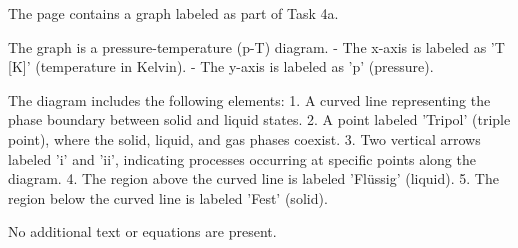 The page contains a graph labeled as part of Task 4a.  

The graph is a pressure-temperature (p-T) diagram.  
- The x-axis is labeled as 'T [K]' (temperature in Kelvin).  
- The y-axis is labeled as 'p' (pressure).  

The diagram includes the following elements:  
1. A curved line representing the phase boundary between solid and liquid states.  
2. A point labeled 'Tripol' (triple point), where the solid, liquid, and gas phases coexist.  
3. Two vertical arrows labeled 'i' and 'ii', indicating processes occurring at specific points along the diagram.  
4. The region above the curved line is labeled 'Flüssig' (liquid).  
5. The region below the curved line is labeled 'Fest' (solid).  

No additional text or equations are present.